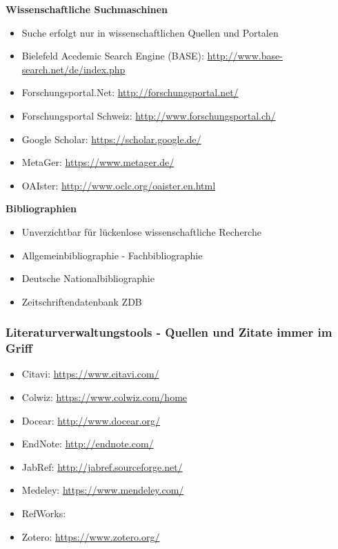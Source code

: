 \textbf{Wissenschaftliche Suchmaschinen}

\begin{itemize}%
\item
  Suche erfolgt nur in wissenschaftlichen Quellen und Portalen
\item
  Bielefeld Acedemic Search Engine (BASE):
  \url{http://www.base-search.net/de/index.php}
\item
  Forschungsportal.Net: \url{http://forschungsportal.net/}
\item
  Forschungsportal Schweiz: \url{http://www.forschungsportal.ch/}
\item
  Google Scholar: \url{https://scholar.google.de/}
\item
  MetaGer: \url{https://www.metager.de/}
\item
  OAIster: \url{http://www.oclc.org/oaister.en.html}
\end{itemize}

\textbf{Bibliographien}

\begin{itemize}%
\item
  Unverzichtbar für lückenlose wissenschaftliche Recherche
\item
  Allgemeinbibliographie - Fachbibliographie
\item
  Deutsche Nationalbibliographie
\item
  Zeitschriftendatenbank ZDB
\end{itemize}

\subsubsection{Literaturverwaltungstools - Quellen und Zitate immer im
Griff}\label{literaturverwaltungstools-quellen-und-zitate-immer-im-griff}

\begin{itemize}%
\item
  Citavi: \url{https://www.citavi.com/}
\item
  Colwiz: \url{https://www.colwiz.com/home}
\item
  Docear: \url{http://www.docear.org/}
\item
  EndNote: \url{http://endnote.com/}
\item
  JabRef: \url{http://jabref.sourceforge.net/}
\item
  Medeley: \url{https://www.mendeley.com/}
\item
  RefWorks: 
\item
  Zotero: \url{https://www.zotero.org/}
\end{itemize}

